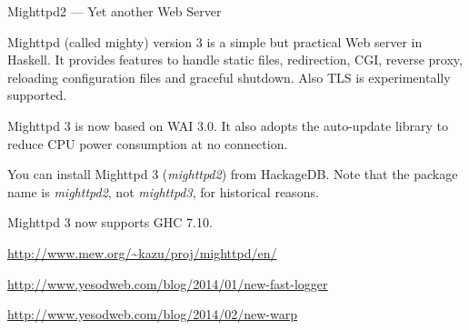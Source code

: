 \begin{hcarentry}[updated]{Mighttpd2 --- Yet another Web Server}
\label{mighttpd2}
\makeheader

Mighttpd (called mighty) version 3 is a simple but practical Web server in Haskell.
It provides features to handle static files, redirection, CGI, reverse proxy, reloading
configuration files and graceful shutdown. Also TLS is experimentally supported.

Mighttpd 3 is now based on WAI 3.0. It also adopts the auto-update
library to reduce CPU power consumption at no connection.

You can install Mighttpd 3 ({\it mighttpd2}) from HackageDB. Note that the package name
is {\it mighttpd2}, not {\it mighttpd3}, for historical reasons.

Mighttpd 3 now supports GHC 7.10.

\FurtherReading
\begin{compactitem}
\item \url{http://www.mew.org/~kazu/proj/mighttpd/en/}
\item \url{http://www.yesodweb.com/blog/2014/01/new-fast-logger}
\item \url{http://www.yesodweb.com/blog/2014/02/new-warp}
\end{compactitem}
\end{hcarentry}
